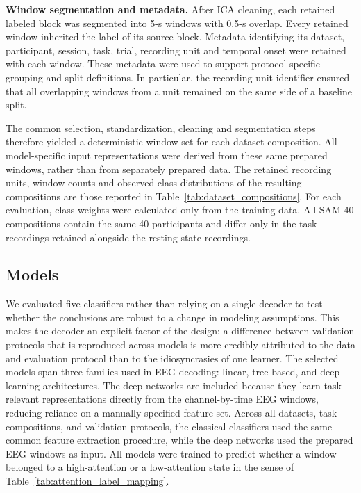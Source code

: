 \documentclass[10pt,letterpaper]{article}
\newcommand{\rev}[1]{#1}
\newcommand{\revs}[1]{#1}
\begin{document}
\rev{\textbf{Window segmentation and metadata.} After ICA cleaning, each
retained labeled block was segmented into 5-s windows with 0.5-s overlap.
Every retained window inherited the label of its source block. Metadata
identifying its dataset, participant, session, task, trial, recording unit and
temporal onset were retained with each window. These metadata were used to
support protocol-specific grouping and split definitions. In particular, the
recording-unit identifier ensured that all overlapping windows from a unit
remained on the same side of a baseline split.}

\rev{The common selection, standardization, cleaning and segmentation steps therefore
yielded a deterministic window set for each dataset composition.
All model-specific input representations were derived from these same prepared
windows, rather than from separately prepared data. The retained recording
units, window counts and observed class distributions of the resulting
compositions are those reported in Table~\ref{tab:dataset_compositions}. For each evaluation,
class weights were calculated only from the training data. All SAM-40 compositions contain the same 40 participants and
differ only in the task recordings retained alongside the resting-state
recordings.}

\subsection*{\revs{Models}}

\rev{We evaluated five classifiers rather than relying on a single decoder to
test whether the conclusions are robust to a change in modeling assumptions.
This makes the decoder an explicit factor of the design: a difference between
validation protocols that is reproduced across models is more credibly
attributed to the data and evaluation protocol than to the idiosyncrasies of
one learner. The selected models span three families used in EEG decoding:
linear, tree-based, and deep-learning architectures. The deep networks are
included because they learn task-relevant representations directly from the
channel-by-time EEG windows, reducing reliance on a manually specified feature
set. Across all datasets, task compositions, and validation protocols, the
classical classifiers used the same common feature extraction procedure, while
the deep networks used the prepared EEG windows as input. All models were trained to predict whether a window belonged to a
high-attention or a low-attention state in the sense of
Table~\ref{tab:attention_label_mapping}.}
\end{document}
